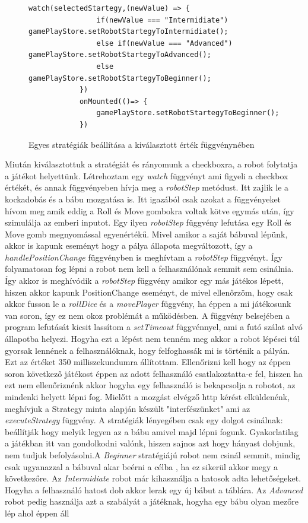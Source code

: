 \documentclass[a4paper,twoside]{article}
\begin{document}
\begin{figure}
	\caption{Egyes stratégiák beállítása a kiválasztott érték függvénynében}
	\begin{minipage}{\textwidth}
		\begin{lstlisting}[style=javascriptStyle]
			watch(selectedStartegy,(newValue) => {
				if(newValue === "Intermidiate") gamePlayStore.setRobotStartegyToIntermidiate();
				else if(newValue === "Advanced") gamePlayStore.setRobotStartegyToAdvanced();
				else gamePlayStore.setRobotStartegyToBeginner();
			})
			onMounted(()=> {
				gamePlayStore.setRobotStartegyToBeginner();
			})
		\end{lstlisting}
	\end{minipage}
	
	\label{setStrat}
\end{figure}
\FloatBarrier
Miután kiválasztottuk a stratégiát és rányomunk a checkboxra, a robot folytatja a játékot helyettünk. Létrehoztam egy \textit{watch} függvényt ami figyeli a checkbox értékét, és annak függvényeben hívja meg a \textit{robotStep} metódust. Itt zajlik le a kockadobás és a bábu mozgatása is. Itt igazából csak azokat a függvényeket hívom meg amik eddig a Roll és Move gombokra voltak kötve egymás után, így szimulálja az emberi inputot. Egy ilyen \textit{robotStep} függvény lefutása egy Roll és Move gomb megnyomással egyenértékű. Mivel amikor a saját bábuval lépünk, akkor is kapunk eseményt hogy a pálya állapota megváltozott, így a \textit{handlePositionChange} függvényben is meghívtam a \textit{robotStep} függvényt. Így folyamatosan fog lépni a robot nem kell a felhasználónak semmit sem csinálnia. Így akkor is meghívódik a \textit{robotStep} függvény amikor egy más játékos lépett, hiszen akkor kapunk PositionChange eseményt, de mivel ellenőrzöm, hogy csak akkor fusson le a \textit{rollDice} és a \textit{movePlayer} függvény, ha éppen a mi játékosunk van soron, így ez nem okoz problémát a működésben. A függvény belsejében a program lefutását kicsit lassítom a \textit{setTimeout} függvénnyel, ami a futó szálat alvó állapotba helyezi. Hogyha ezt a lépést nem tenném meg akkor a robot lépései túl gyorsak lennének a felhasználóknak, hogy felfoghassák mi is történik a pályán. Ezt az értéket 350  milliszekundumra állítottam. Ellenőrizni kell hogy az éppen soron következő játékost éppen az adott felhasználó csatlakoztatta-e fel, hiszen ha ezt nem ellenőriznénk akkor hogyha egy felhasználó is bekapcsolja a robotot, az mindenki helyett lépni fog. Mielőtt a mozgást elvégző http kérést elküldenénk, meghívjuk a Strategy minta alapján készült "interfészünket" ami az \textit{executeStrategy} függvény. A stratégiák lényegében csak egy dolgot csinálnak: beállítják hogy melyik legyen az a bábu amivel majd lépni fogunk. Gyakorlatilag a játékban itt van gondolkodni valónk, hiszen sajnos azt hogy hányast dobjunk, nem tudjuk befolyásolni.A \textit{Beginner} stratégiájú robot nem csinál semmit, mindig csak ugyanazzal a bábuval akar beérni a célba , ha ez sikerül akkor megy a következőre. Az \textit{Intermidiate} robot már kihasználja a hatosok adta lehetőségeket. Hogyha a felhasználó hatost dob akkor lerak egy új bábut a táblára. Az \textit{Advanced} robot pedig használja azt a szabályát a játéknak, hogyha egy bábu olyan mezőre lép ahol éppen áll 
\end{document}
